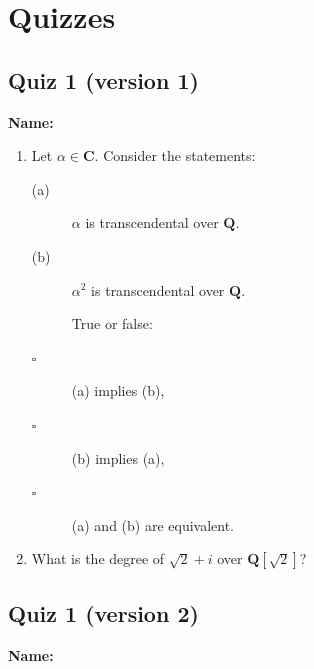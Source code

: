 \documentclass[11pt]{article}
\begin{document}
\section{Quizzes}
\label{sec:org05f0fc4}
\subsection{Quiz 1 (version 1)}
\label{sec:org14ade8a}
\textbf{Name:}

\vspace{1cm}

\begin{enumerate}
\item Let \(\alpha \in \mathbf{C}\).
Consider the statements:
\begin{description}
\item[{(a)}] \(\alpha\) is transcendental over \(\mathbf{Q}\).
\item[{(b)}] \(\alpha^2\) is transcendental over \(\mathbf{Q}\).

True or false:
\item[{$\square$}] (a) implies (b),
\item[{$\square$}] (b) implies (a),
\item[{$\square$}] (a) and (b) are equivalent.
\end{description}

\vspace{5cm}

\item What is the degree of \(\sqrt  2 + i\) over \(\mathbf{Q}[\sqrt 2]\)?
\end{enumerate}
\subsection{Quiz 1 (version 2)}
\label{sec:org1c6f752}
\noindent
\textbf{Name:}

\bigskip
\end{document}
